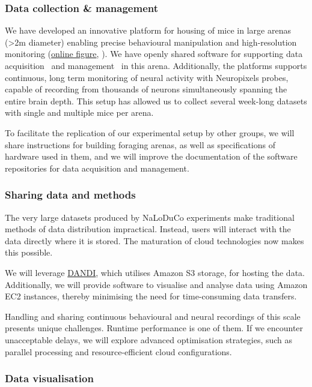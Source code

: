 \subsubsection{Data collection \& management}

We have developed an innovative platform for housing of mice in large arenas
(\textgreater 2m diameter) enabling precise behavioural manipulation and
high-resolution monitoring
(\href{https://www.gatsby.ucl.ac.uk/~rapela/bbsrc\_nsfbio/figures/foragingArena.png}{online
figure}, \cite{campagnerEtAl24}).
%
We have openly shared software for supporting data
acquisition~\cite{aeonacquisition} and management~\cite{aeonmecha} in this
arena.
%
Additionally, the platforms supports continuous, long term monitoring of neural
activity with Neuropixels probes, capable of recording from thousands of
neurons simultaneously spanning the entire brain depth.
%
This setup has allowed us to collect several week-long datasets with single and
multiple mice per arena.

To facilitate the replication of our experimental setup by other groups, we
will share instructions for building foraging arenas, as well as specifications
of hardware used in them,
%
and we will improve the documentation of the software repositories for data
acquisition and management.

\subsubsection{Sharing data and methods}

The very large datasets produced by NaLoDuCo experiments make traditional
methods of data distribution impractical. Instead, users will interact with the
data directly where it is stored. The maturation of cloud technologies now
makes this possible.

We will leverage \href{https://www.dandiarchive.org/}{DANDI}, which utilises
Amazon S3 storage, for hosting the data. Additionally, we will provide software
to visualise and analyse data using Amazon EC2 instances, thereby minimising
the need for time-consuming data transfers.

Handling and sharing continuous behavioural and neural recordings of this scale
presents unique challenges. Runtime performance is one of them. If we
encounter unacceptable delays, we will explore advanced optimisation
strategies, such as parallel processing and resource-efficient cloud
configurations.

\subsubsection{Data visualisation}

